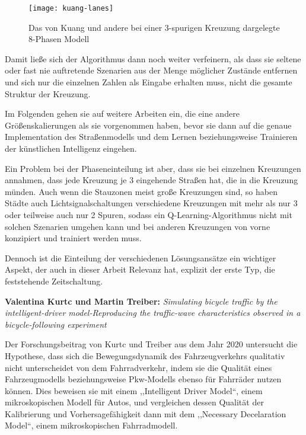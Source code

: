 \begin{figure}[h]
    \centering
    \texttt{[image: kuang-lanes]}~\caption{Das von Kuang und andere bei einer 3-spurigen Kreuzung dargelegte 8-Phasen Modell~\cite[S. 6]{Kuang2021}}
    \label{fig:kuang-lanes}
\end{figure}

Damit ließe sich der Algorithmus dann noch weiter verfeinern, als dass sie seltene oder fast nie auftretende Szenarien aus der Menge möglicher Zustände entfernen und sich nur die einzelnen Zahlen als Eingabe erhalten muss, nicht die gesamte Struktur der Kreuzung.

Im Folgenden gehen sie auf weitere Arbeiten ein, die eine andere Größenskalierungen als sie vorgenommen haben, bevor sie dann auf die genaue Implementation des Straßenmodells und dem Lernen beziehungsweise Trainieren der künstlichen Intelligenz eingehen.

Ein Problem bei der Phaseneinteilung ist aber, dass sie bei einzelnen Kreuzungen annahmen, dass jede Kreuzung je 3 eingehende Straßen hat, die in die Kreuzung münden.
Auch wenn die Stauzonen meist große Kreuzungen sind, so haben Städte auch Lichtsignalschaltungen verschiedene Kreuzungen mit mehr als nur 3 oder teilweise auch nur 2 Spuren, sodass ein Q-Learning-Algorithmus nicht mit solchen Szenarien umgehen kann und bei anderen Kreuzungen von vorne konzipiert und trainiert werden muss.

Dennoch ist die Einteilung der verschiedenen Lösungsansätze ein wichtiger Aspekt, der auch in dieser Arbeit Relevanz hat, explizit der erste Typ, die feststehende Zeitschaltung.


\textbf{Valentina Kurtc und Martin Treiber:}
\textit{Simulating bicycle traffic by the intelligent-driver model-Reproducing the traffic-wave characteristics observed in a bicycle-following experiment}

Der Forschungsbeitrag von Kurtc und Treiber aus dem Jahr 2020 untersucht die Hypothese, dass sich die Bewegungsdynamik des Fahrzeugverkehrs qualitativ nicht unterscheidet von dem Fahrradverkehr, indem sie die Qualität eines Fahrzeugmodells beziehungsweise Pkw-Modells ebenso für Fahrräder nutzen können.
Dies beweisen sie mit einem ,,Intelligent Driver Model``\cite[S. 20]{Kurtc2020}, einem mikroskopischen Modell für Autos, und vergleichen dessen Qualität der Kalibrierung und Vorhersagefähigkeit dann mit dem ,,Necessary Decelaration Model``\cite[S. 20]{Kurtc2020}, einem mikroskopischen Fahrradmodell.


